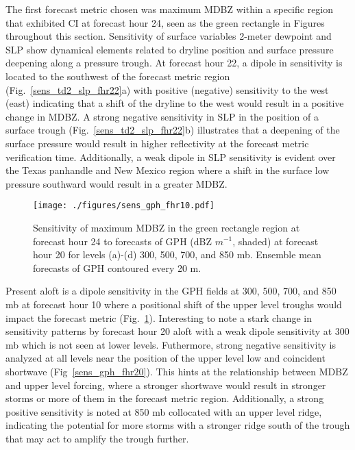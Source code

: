 \documentclass{ttuthes2007}
\newcommand{\tab}{\hspace*{2em}}  %
\begin{document}
\tab The first forecast metric chosen was maximum MDBZ within a specific region that exhibited CI at forecast hour 24, seen as the green rectangle in Figures throughout this section. Sensitivity of surface variables 2-meter dewpoint and SLP show dynamical elements related to dryline position and surface pressure deepening along a pressure trough. At forecast hour 22, a dipole in sensitivity is located to the southwest of the forecast metric region (Fig.~\ref{sens_td2_slp_fhr22}a) with positive (negative) sensitivity to the west (east) indicating that a shift of the dryline to the west would result in a positive change in MDBZ. A strong negative sensitivity in SLP in the position of a surface trough (Fig.~\ref{sens_td2_slp_fhr22}b) illustrates that a deepening of the surface pressure would result in higher reflectivity at the forecast metric verification time. Additionally, a weak dipole in SLP sensitivity is evident over the Texas panhandle and New Mexico region where a shift in the surface low pressure southward would result in a greater MDBZ. 

\begin{figure}[!tb]
  \centering
  \noindent\texttt{[image: ./figures/sens\_gph\_fhr10.pdf]}\\
  \caption{Sensitivity of maximum MDBZ in the green rectangle region at forecast hour 24 to forecasts of GPH (dBZ $m^{-1}$, shaded) at forecast hour 20 for levels (a)-(d) 300, 500, 700, and 850 mb. Ensemble mean forecasts of GPH contoured every 20 m.}
\label{sens_gph_fhr10}
\end{figure}

\tab Present aloft is a dipole sensitivity in the GPH fields at 300, 500, 700, and 850 mb at forecast hour 10 where a positional shift of the upper level troughs would impact the forecast metric (Fig.~\ref{sens_gph_fhr10}). Interesting to note a stark change in sensitivity patterns by forecast hour 20 aloft with a weak dipole sensitivity at 300 mb which is not seen at lower levels. Futhermore, strong negative sensitivity is analyzed at all levels near the position of the upper level low and coincident shortwave (Fig~\ref{sens_gph_fhr20}). This hints at the relationship between MDBZ and upper level forcing, where a stronger shortwave would result in stronger storms or more of them in the forecast metric region. Additionally, a strong positive sensitivity is noted at 850 mb collocated with an upper level ridge, indicating the potential for more storms with a stronger ridge south of the trough that may act to amplify the trough further. 
\end{document}
